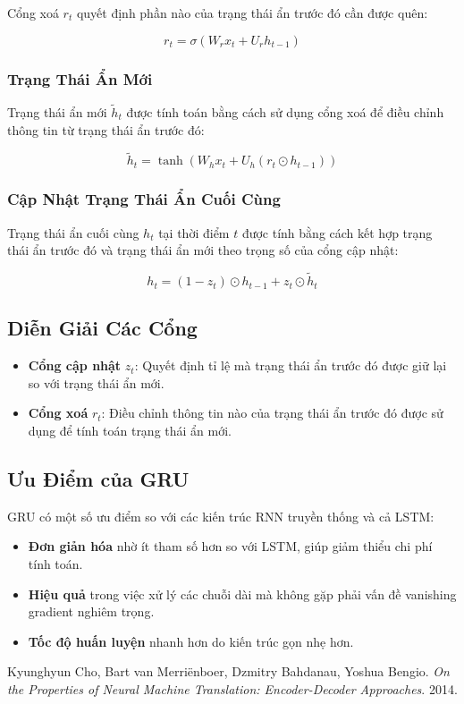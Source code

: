 \documentclass{article}
\begin{document}
Cổng xoá \( r_t \) quyết định phần nào của trạng thái ẩn trước đó cần được quên:

\[
r_t = \sigma(W_r x_t + U_r h_{t-1})
\]

\subsubsection{Trạng Thái Ẩn Mới}

Trạng thái ẩn mới \( \tilde{h}_t \) được tính toán bằng cách sử dụng cổng xoá để điều chỉnh thông tin từ trạng thái ẩn trước đó:

\[
\tilde{h}_t = \tanh(W_h x_t + U_h (r_t \odot h_{t-1}))
\]

\subsubsection{Cập Nhật Trạng Thái Ẩn Cuối Cùng}

Trạng thái ẩn cuối cùng \( h_t \) tại thời điểm \( t \) được tính bằng cách kết hợp trạng thái ẩn trước đó và trạng thái ẩn mới theo trọng số của cổng cập nhật:

\[
h_t = (1 - z_t) \odot h_{t-1} + z_t \odot \tilde{h}_t
\]

\subsection{Diễn Giải Các Cổng}

\begin{itemize}
    \item \textbf{Cổng cập nhật} \( z_t \): Quyết định tỉ lệ mà trạng thái ẩn trước đó được giữ lại so với trạng thái ẩn mới.
    \item \textbf{Cổng xoá} \( r_t \): Điều chỉnh thông tin nào của trạng thái ẩn trước đó được sử dụng để tính toán trạng thái ẩn mới.
\end{itemize}

\subsection{Ưu Điểm của GRU}

GRU có một số ưu điểm so với các kiến trúc RNN truyền thống và cả LSTM:

\begin{itemize}
    \item \textbf{Đơn giản hóa} nhờ ít tham số hơn so với LSTM, giúp giảm thiểu chi phí tính toán.
    \item \textbf{Hiệu quả} trong việc xử lý các chuỗi dài mà không gặp phải vấn đề vanishing gradient nghiêm trọng.
    \item \textbf{Tốc độ huấn luyện} nhanh hơn do kiến trúc gọn nhẹ hơn.
\end{itemize}

\begin{thebibliography}{9}
 Kyunghyun Cho, Bart van Merriënboer, Dzmitry Bahdanau, Yoshua Bengio. \textit{On the Properties of Neural Machine Translation: Encoder-Decoder Approaches}. 2014.
\end{thebibliography}
\end{document}
